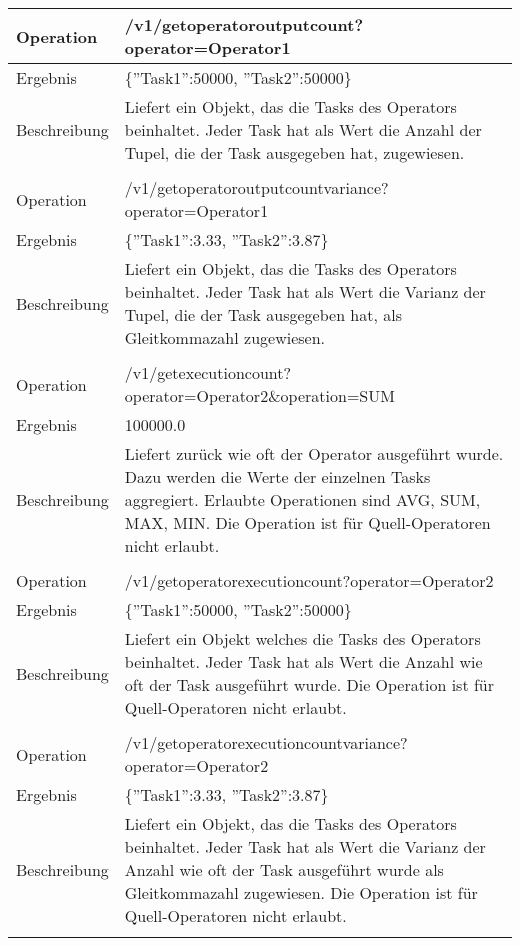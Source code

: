 \begin{longtable}{|p{2cm}|p{12cm}|}
Operation & /v1/getoperatoroutputcount?operator=Operator1 \\ \hline
Ergebnis & \{''Task1'':50000, ''Task2'':50000\} \\ \hline
Beschreibung & Liefert ein Objekt, das die Tasks des Operators beinhaltet. Jeder Task hat als Wert die Anzahl der Tupel, die der Task ausgegeben hat, zugewiesen. \\ \hline
\multicolumn{2}{|l|}{} \\ \hline

Operation & /v1/getoperatoroutputcountvariance?operator=Operator1 \\ \hline
Ergebnis & \{''Task1'':3.33, ''Task2'':3.87\} \\ \hline
Beschreibung & Liefert ein Objekt, das die Tasks des Operators beinhaltet. Jeder Task hat als Wert die Varianz der Tupel, die der Task ausgegeben hat, als Gleitkommazahl zugewiesen. \\ \hline
\multicolumn{2}{|l|}{} \\ \hline

Operation & /v1/getexecutioncount?operator=Operator2\&operation=SUM \\ \hline
Ergebnis & 100000.0 \\ \hline
Beschreibung & Liefert zurück wie oft der Operator ausgeführt wurde. Dazu werden die Werte der einzelnen Tasks aggregiert. Erlaubte Operationen sind AVG, SUM, MAX, MIN. Die Operation ist für Quell-Operatoren nicht erlaubt. \\ \hline
\multicolumn{2}{|l|}{} \\ \hline

Operation & /v1/getoperatorexecutioncount?operator=Operator2 \\ \hline
Ergebnis & \{''Task1'':50000, ''Task2'':50000\} \\ \hline
Beschreibung & Liefert ein Objekt welches die Tasks des Operators beinhaltet. Jeder Task hat als Wert die Anzahl wie oft der Task ausgeführt wurde. Die Operation ist für Quell-Operatoren nicht erlaubt. \\ \hline
\multicolumn{2}{|l|}{} \\ \hline

Operation & /v1/getoperatorexecutioncountvariance?operator=Operator2 \\ \hline
Ergebnis & \{''Task1'':3.33, ''Task2'':3.87\} \\ \hline
Beschreibung & Liefert ein Objekt, das die Tasks des Operators beinhaltet. Jeder Task hat als Wert die Varianz der Anzahl wie oft der Task ausgeführt wurde als Gleitkommazahl zugewiesen. Die Operation ist für Quell-Operatoren nicht erlaubt. \\ \hline
\multicolumn{2}{|l|}{} \\ \hline


\end{longtable}
